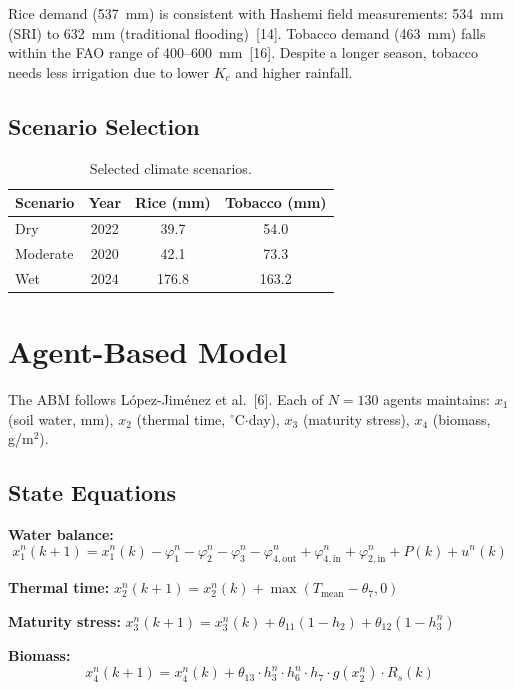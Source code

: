 \documentclass[12pt,a4paper]{article}
\begin{document}
Rice demand (537~mm) is consistent with Hashemi field measurements: 534~mm (SRI) to 632~mm (traditional flooding)~[14]. Tobacco demand (463~mm) falls within the FAO range of 400--600~mm~[16]. Despite a longer season, tobacco needs less irrigation due to lower $K_c$ and higher rainfall.

\subsection{Scenario Selection}

\begin{table}[H]
\centering
\caption{Selected climate scenarios.}
\begin{tabular}{lccc}
\toprule
\textbf{Scenario} & \textbf{Year} & \textbf{Rice (mm)} & \textbf{Tobacco (mm)} \\
\midrule
Dry & 2022 & 39.7 & 54.0 \\
Moderate & 2020 & 42.1 & 73.3 \\
Wet & 2024 & 176.8 & 163.2 \\
\bottomrule
\end{tabular}
\end{table}


\section{Agent-Based Model}

The ABM follows L\'{o}pez-Jim\'{e}nez et al.~[6]. Each of $N = 130$ agents maintains: $x_1$ (soil water, mm), $x_2$ (thermal time, $^{\circ}$C$\cdot$day), $x_3$ (maturity stress), $x_4$ (biomass, g/m$^2$).

\subsection{State Equations}

\textbf{Water balance:}
\begin{equation}
x_1^n(k\!+\!1) = x_1^n(k) - \varphi_1^n - \varphi_2^n - \varphi_3^n - \varphi_{4,\text{out}}^n + \varphi_{4,\text{in}}^n + \varphi_{2,\text{in}}^n + P(k) + u^n(k)
\label{eq:water}
\end{equation}

\textbf{Thermal time:} $x_2^n(k+1) = x_2^n(k) + \max(T_{\text{mean}} - \theta_7, 0)$

\textbf{Maturity stress:} $x_3^n(k+1) = x_3^n(k) + \theta_{11}(1-h_2) + \theta_{12}(1-h_3^n)$

\textbf{Biomass:}
\begin{equation}
x_4^n(k\!+\!1) = x_4^n(k) + \theta_{13} \cdot h_3^n \cdot h_6^n \cdot h_7 \cdot g(x_2^n) \cdot R_s(k)
\label{eq:biomass}
\end{equation}
\end{document}
